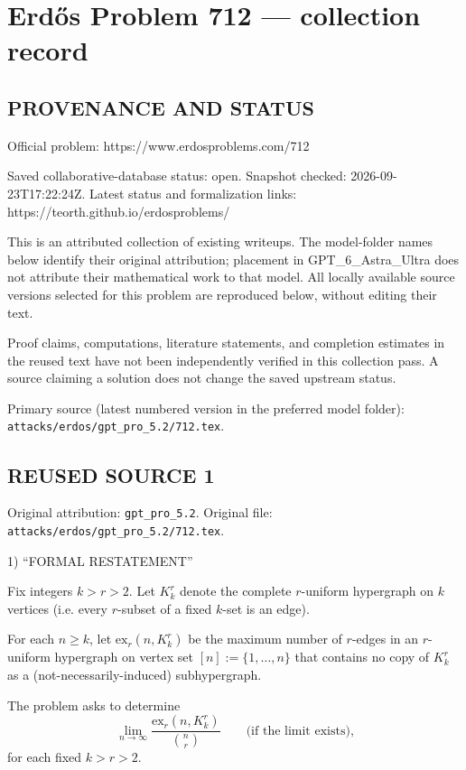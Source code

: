 \section*{Erd\H{o}s Problem 712 --- collection record}

\subsection*{PROVENANCE AND STATUS}
Official problem: https://www.erdosproblems.com/712

Saved collaborative-database status: open.
Snapshot checked: 2026-09-23T17:22:24Z.
Latest status and formalization links: https://teorth.github.io/erdosproblems/

This is an attributed collection of existing writeups. The model-folder names below identify their original attribution; placement in GPT\_6\_Astra\_Ultra does not attribute their mathematical work to that model. All locally available source versions selected for this problem are reproduced below, without editing their text.

Proof claims, computations, literature statements, and completion estimates in the reused text have not been independently verified in this collection pass. A source claiming a solution does not change the saved upstream status.

Primary source (latest numbered version in the preferred model folder): \texttt{attacks/erdos/gpt\_pro\_5.2/712.tex}.

\subsection*{REUSED SOURCE 1}
Original attribution: \texttt{gpt\_pro\_5.2}.
Original file: \texttt{attacks/erdos/gpt\_pro\_5.2/712.tex}.


1) “FORMAL RESTATEMENT”

Fix integers $k>r>2$. Let $K_k^r$ denote the complete $r$-uniform hypergraph on $k$ vertices (i.e. every $r$-subset of a fixed $k$-set is an edge).

For each $n\ge k$, let $\mathrm{ex}_r(n,K_k^r)$ be the maximum number of $r$-edges in an $r$-uniform hypergraph on vertex set $[n]:=\{1,\dots,n\}$ that contains no copy of $K_k^r$ as a (not-necessarily-induced) subhypergraph.

The problem asks to determine
\[
\lim_{n\to\infty}\frac{\mathrm{ex}_r(n,K_k^r)}{\binom{n}{r}}\qquad\text{(if the limit exists),}
\]
for each fixed $k>r>2$.


